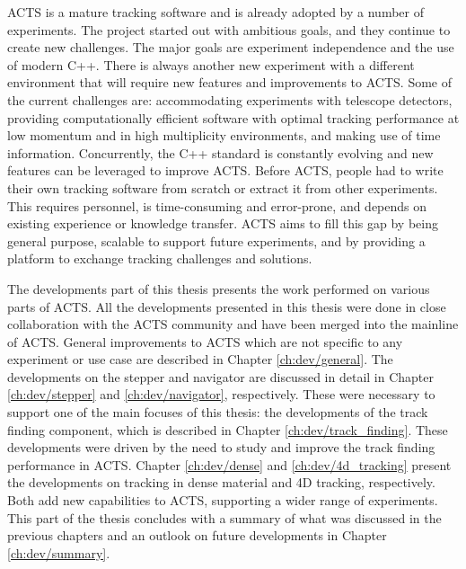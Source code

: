 ACTS is a mature tracking software and is already adopted by a number of experiments. The project started out with ambitious goals, and they continue to create new challenges. The major goals are experiment independence and the use of modern C++. There is always another new experiment with a different environment that will require new features and improvements to ACTS. Some of the current challenges are: accommodating experiments with telescope detectors, providing computationally efficient software with optimal tracking performance at low momentum and in high multiplicity environments, and making use of time information. Concurrently, the C++ standard is constantly evolving and new features can be leveraged to improve ACTS. Before ACTS, people had to write their own tracking software from scratch or extract it from other experiments. This requires personnel, is time-consuming and error-prone, and depends on existing experience or knowledge transfer. ACTS aims to fill this gap by being general purpose, scalable to support future experiments, and by providing a platform to exchange tracking challenges and solutions.

The developments part of this thesis presents the work performed on various parts of ACTS. All the developments presented in this thesis were done in close collaboration with the ACTS community and have been merged into the mainline of ACTS. General improvements to ACTS which are not specific to any experiment or use case are described in Chapter \ref{ch:dev/general}. The developments on the stepper and navigator are discussed in detail in Chapter \ref{ch:dev/stepper} and \ref{ch:dev/navigator}, respectively. These were necessary to support one of the main focuses of this thesis: the developments of the track finding component, which is described in Chapter \ref{ch:dev/track_finding}. These developments were driven by the need to study and improve the track finding performance in ACTS. Chapter \ref{ch:dev/dense} and \ref{ch:dev/4d_tracking} present the developments on tracking in dense material and 4D tracking, respectively. Both add new capabilities to ACTS, supporting a wider range of experiments. This part of the thesis concludes with a summary of what was discussed in the previous chapters and an outlook on future developments in Chapter \ref{ch:dev/summary}.
